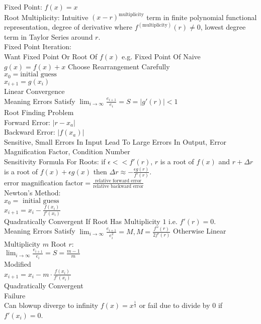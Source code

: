 Fixed Point: $f(x)=x$ \\
Root Multiplicity: Intuitive $(x-r)^{\text{multiplicity}}$ term in finite polynomial functional representation, degree of derivative where $f^{(\text{multiplicity})}(r) \neq 0$, lowest degree term in Taylor Series around $r$. \\
Fixed Point Iteration: \\
Want Fixed Point Or Root Of $f(x)$ e.g. Fixed Point Of Naive $g(x)=f(x)+x$ Choose Rearrangement Carefully \\
$x_0 = \text{initial guess}$ \\
$x_{i+1} = g(x_i)$ \\
Linear Convergence \\
Meaning Errors Satisfy $\lim_{i \to \infty} \frac{e_{i+1}}{e_i} = S = |g'(r)| < 1$ \\
Root Finding Problem \\
Forward Error: $|r-x_a|$ \\
Backward Error: $|f(x_a)|$ \\
Sensitive, Small Errors In Input Lead To Large Errors In Output, Error Magnification Factor, Condition Number \\
Sensitivity Formula For Roots: if $\epsilon << f'(r)$, $r$ is a root of $f(x)$ and $r + \Delta r$ is a root of $f(x) + \epsilon g(x)$ then $\Delta r \approx - \frac{\epsilon g(r)}{f'(r)}$. \\
$\text{error magnification factor} = \frac{\text{relative forward error}}{\text{relative backward error}}$ \\
Newton's Method: \\
$x_0 = \text{ initial guess}$ \\
$x_{i+1} = x_i - \frac{f(x_i)}{f'(x_i)}$ \\
Quadratically Convergent If Root Has Multiplicity $1$ i.e. $f'(r) = 0$. \\
Meaning Errors Satisfy $\lim_{i \to \infty} \frac{e_{i+1}}{e_i^2} = M, M = \frac{f''(r)}{2f'(r)}$ Otherwise Linear \\
Multiplicity $m$ Root $r$: \\
$\lim_{i \to \infty} \frac{e_{i+1}}{e_i} = S = \frac{m-1}{m}$ \\
Modified \\
$x_{i+1} = x_i - m \cdot \frac{f(x_i)}{f'(x_i)}$ \\
Quadratically Convergent \\
Failure \\
Can blowup diverge to infinity $f(x)=x^{\frac{1}{3}}$ or fail due to divide by $0$ if $f'(x_i) = 0$. \\
